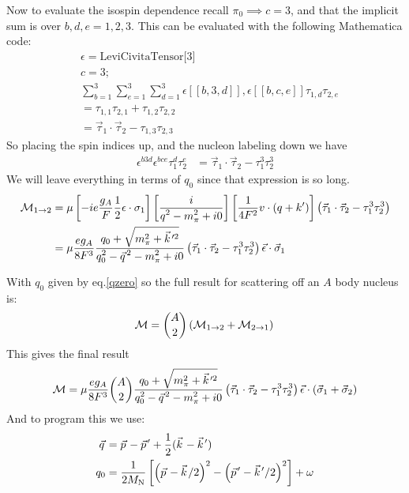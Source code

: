 \documentclass[11pt]{article}
\newcommand\ddfrac[2]{\frac{\displaystyle #1}{\displaystyle #2}}
\newcommand{\vectorwithspace}[1]{\vec{#1}\mkern2mu\vphantom{#1}}
\newcommand{\kv}{\vectorwithspace{k}}
\newcommand{\pv}{\vectorwithspace{p}}
\newcommand{\qv}{\vectorwithspace{q}}
\newcommand{\mpi}{\ensuremath{m_\pi}}
\newcommand{\ga}{\ensuremath{g_A}}
\newcommand{\MN}{\ensuremath{M_\mathrm{N}}} %
\newcommand{\calM}{\mathcal{M}} \newcommand{\calN}{\mathcal{N}}
\begin{document}
Now to evaluate the isospin dependence recall $\pi_0\implies c=3$,
and that the implicit sum is over $b, d,e=1,2,3$. This can be
evaluated with the following Mathematica code:
\begin{align}
	 & \epsilon=\text{LeviCivitaTensor[3]}\;                     \\
	 & c=3;                                                      \\
	 & \sum_{b=1}^3 \sum_{e=1}^3 \sum_{d=1}^3 \epsilon[[b,3,d]],
	\epsilon[[b,c,e]] \tau_{1,d} \tau_{2,e}                      \\
	 & =\tau _{1,1} \tau _{2,1}+\tau _{1,2} \tau _{2,2}          \\
	 & =\vec{\tau}_1 \cdot \vec{\tau}_2-\tau_{1,3} \tau_{2,3}
\end{align}
So placing the spin indices up, and the nucleon labeling down we have
\begin{align}
	\epsilon^{b3d} \epsilon^{bce} \tau_1^d \tau_2^e & =\vec{\tau}_1 \cdot
	\vec{\tau}_2-\tau_{1}^{3} \tau_{2}^{3}
\end{align}
We will leave everything in terms of $q_0$ since that expression is so long.
\begin{align}
	\calM_{1\to2} & =\mu \left[-i e \frac{\ga}{F} \frac{1}{2} {\epsilon}
		\cdot \sigma_1 \right]
	\left[ \ddfrac{i}{q^2 -\mpi^2+i0 }  \right]
	\left[ \frac{1}{4 F^2} v \cdot \left( q + k' \right) \right]
	\left(\vec{\tau}_1 \cdot \vec{\tau}_2-\tau_{1}^{3} \tau_{2}^{3}\right) \\
	              & =\mu\frac{e\ga}{8F^3}
	\ddfrac{q_0+\sqrt{\mpi^2 +\kv'^2}}{q_0^2-\qv^2 -\mpi^2+i0 }
	\left(\vec{\tau}_1 \cdot \vec{\tau}_2-\tau_{1}^{3} \tau_{2}^{3}\right)
	\vec{\epsilon} \cdot \vec{\sigma}_1
\end{align}

With $q_0$ given by eq.\ref{qzero} so the full result for scattering
off an $A$ body nucleus is:
\begin{equation}
	\calM=\binom{A}{2}\left(\calM_{1\to2}+\calM_{2\to1}\right)\\
\end{equation}
This gives the final result
\begin{equation}
	\calM= \mu\frac{e\ga}{8F^3} \binom{A}{2}
	\ddfrac{q_0+\sqrt{\mpi^2 +\kv'^2}}{q_0^2-\qv^2 -\mpi^2+i0 }
	\left(\vec{\tau}_1 \cdot \vec{\tau}_2-\tau_{1}^{3} \tau_{2}^{3}\right)
	\vec{\epsilon} \cdot \left(\vec{\sigma}_1 +\vec{\sigma}_2\right)
\end{equation}
And to program this we use:
\begin{align}
	\qv & =\pv-\pv'+\frac{1}{2}(\kv-\kv')                      \\
	q_0 & =\frac{1}{2\MN}\left[ \left( \pv - \kv/2 \right)^2 -
		\left( \pv' - \kv'/2 \right)^2\right]+\omega
\end{align}
\end{document}
